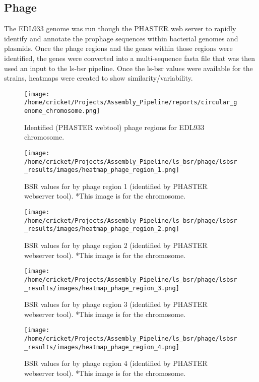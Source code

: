 \documentclass[11pt]{article}
\begin{document}
\subsection*{Phage}
The EDL933 genome was run though the PHASTER web server to rapidly identify and annotate the prophage sequences within bacterial genomes and plasmids. Once the phage regions and the genes within those regions were identified, the genes were converted into a multi-sequence fasta file that was then used an input to the ls-bsr pipeline. Once the ls-bsr values were available for the strains, heatmaps were created to show similarity/variability. 

\begin{figure}[ht!]\normalsize %
\centering
\texttt{[image: /home/cricket/Projects/Assembly\_Pipeline/reports/circular\_genome\_chromosome.png]}
\caption{Identified (PHASTER webtool) phage regions for EDL933 chromosome.}
\label{phage_regions}
\end{figure}

\begin{figure}[ht!]\normalsize %
\centering
\texttt{[image: /home/cricket/Projects/Assembly\_Pipeline/ls\_bsr/phage/lsbsr\_results/images/heatmap\_phage\_region\_1.png]} 
\caption{BSR values for by phage region 1 (identified by PHASTER webserver tool). *This image is for the chromosome.}
\label{phage_1}
\end{figure}

\clearpage

\begin{figure}[ht!]\normalsize %
\centering
\texttt{[image: /home/cricket/Projects/Assembly\_Pipeline/ls\_bsr/phage/lsbsr\_results/images/heatmap\_phage\_region\_2.png]} 
\caption{BSR values for by phage region 2 (identified by PHASTER webserver tool). *This image is for the chromosome.}
\label{phage_2}
\end{figure}

\begin{figure}[ht!]\normalsize %
\centering
\texttt{[image: /home/cricket/Projects/Assembly\_Pipeline/ls\_bsr/phage/lsbsr\_results/images/heatmap\_phage\_region\_3.png]} 
\caption{BSR values for by phage region 3 (identified by PHASTER webserver tool). *This image is for the chromosome.}
\label{phage_3}
\end{figure}

\clearpage

\begin{figure}[ht!]\normalsize %
\centering
\texttt{[image: /home/cricket/Projects/Assembly\_Pipeline/ls\_bsr/phage/lsbsr\_results/images/heatmap\_phage\_region\_4.png]} 
\caption{BSR values for by phage region 4 (identified by PHASTER webserver tool). *This image is for the chromosome.}
\label{phage_4}
\end{figure}
\end{document}
